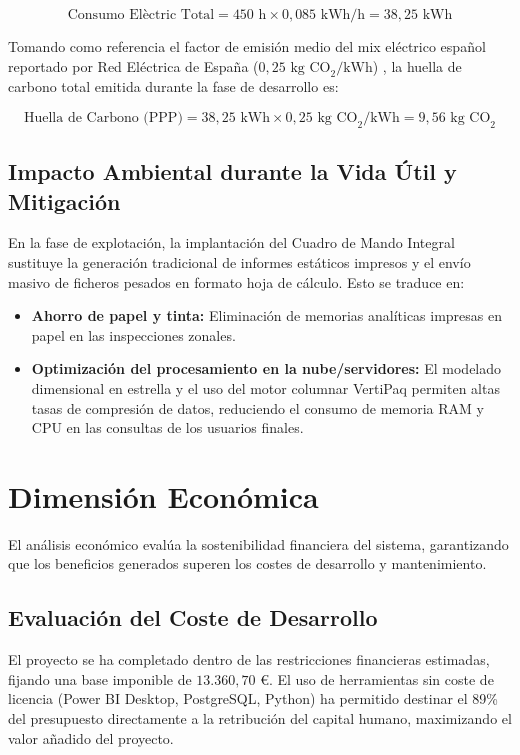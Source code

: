 \documentclass[12pt, a4paper, twoside]{report}
\begin{document}
\begin{equation}
\text{Consumo Elèctric Total} = 450 \text{ h} \times 0,085 \text{ kWh/h} = 38,25 \text{ kWh}
\end{equation}

Tomando como referencia el factor de emisión medio del mix eléctrico español reportado por Red Eléctrica de España ($0,25 \text{ kg CO}_2/\text{kWh}$) \cite{ree_emisiones}, la huella de carbono total emitida durante la fase de desarrollo es:

\begin{equation}
\text{Huella de Carbono (PPP)} = 38,25 \text{ kWh} \times 0,25 \text{ kg CO}_2/\text{kWh} = 9,56 \text{ kg CO}_2
\end{equation}

\subsection{Impacto Ambiental durante la Vida Útil y Mitigación}
En la fase de explotación, la implantación del Cuadro de Mando Integral sustituye la generación tradicional de informes estáticos impresos y el envío masivo de ficheros pesados en formato hoja de cálculo. Esto se traduce en:
\begin{itemize}
    \item \textbf{Ahorro de papel y tinta:} Eliminación de memorias analíticas impresas en papel en las inspecciones zonales.
    \item \textbf{Optimización del procesamiento en la nube/servidores:} El modelado dimensional en estrella y el uso del motor columnar VertiPaq permiten altas tasas de compresión de datos, reduciendo el consumo de memoria RAM y CPU en las consultas de los usuarios finales.
\end{itemize}

\section{Dimensión Económica}
El análisis económico evalúa la sostenibilidad financiera del sistema, garantizando que los beneficios generados superen los costes de desarrollo y mantenimiento.

\subsection{Evaluación del Coste de Desarrollo}
El proyecto se ha completado dentro de las restricciones financieras estimadas, fijando una base imponible de $13.360,70 \text{ €}$. El uso de herramientas sin coste de licencia (Power BI Desktop, PostgreSQL, Python) ha permitido destinar el 89\% del presupuesto directamente a la retribución del capital humano, maximizando el valor añadido del proyecto.
\end{document}
